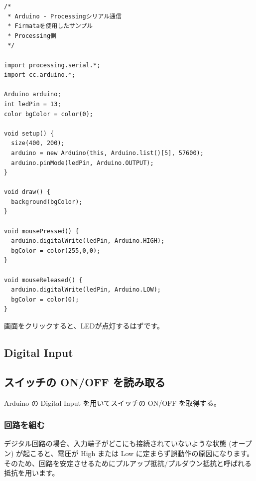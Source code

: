 \documentclass[11pt,a4paper]{jarticle}
\begin{document}
\begin{lstlisting}
/*
 * Arduino - Processingシリアル通信
 * Firmataを使用したサンプル
 * Processing側
 */
 
import processing.serial.*;
import cc.arduino.*;
 
Arduino arduino;
int ledPin = 13;
color bgColor = color(0);
 
void setup() {
  size(400, 200);
  arduino = new Arduino(this, Arduino.list()[5], 57600);
  arduino.pinMode(ledPin, Arduino.OUTPUT);
}
 
void draw() {
  background(bgColor);
}
 
void mousePressed() {
  arduino.digitalWrite(ledPin, Arduino.HIGH);
  bgColor = color(255,0,0);
}
 
void mouseReleased() {
  arduino.digitalWrite(ledPin, Arduino.LOW);
  bgColor = color(0);
}
\end{lstlisting}
画面をクリックすると、LEDが点灯するはずです。

\subsection*{Digital Input}
\subsection*{スイッチの ON/OFF を読み取る}
Arduino の Digital Input を用いてスイッチの ON/OFF を取得する。

\subsubsection*{回路を組む}
デジタル回路の場合、入力端子がどこにも接続されていないような状態 (オープン) が起こると、電圧が High または Low に定まらず誤動作の原因になります。
そのため、回路を安定させるためにプルアップ抵抗/プルダウン抵抗と呼ばれる抵抗を用います。
\end{document}

